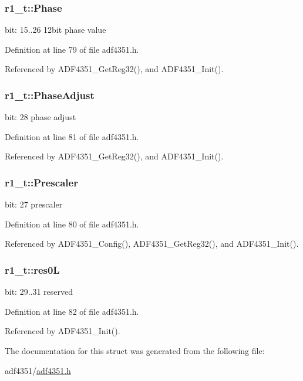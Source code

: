 \subsubsection[{\texorpdfstring{Phase}{Phase}}]{ r1\+\_\+t\+::\+Phase}\hypertarget{structr1__t_a08f87626a225a1256a9c45bb0d42af8a}{}\label{structr1__t_a08f87626a225a1256a9c45bb0d42af8a}
bit\+: 15..26 12bit phase value 

Definition at line 79 of file adf4351.\+h.



Referenced by A\+D\+F4351\+\_\+\+Get\+Reg32(), and A\+D\+F4351\+\_\+\+Init().

\subsubsection[{\texorpdfstring{Phase\+Adjust}{PhaseAdjust}}]{ r1\+\_\+t\+::\+Phase\+Adjust}\hypertarget{structr1__t_a339b676bde09218794b49904eb456a38}{}\label{structr1__t_a339b676bde09218794b49904eb456a38}
bit\+: 28 phase adjust 

Definition at line 81 of file adf4351.\+h.



Referenced by A\+D\+F4351\+\_\+\+Get\+Reg32(), and A\+D\+F4351\+\_\+\+Init().

\subsubsection[{\texorpdfstring{Prescaler}{Prescaler}}]{ r1\+\_\+t\+::\+Prescaler}\hypertarget{structr1__t_a9ee672a7fdd3a2d60591d43557feb390}{}\label{structr1__t_a9ee672a7fdd3a2d60591d43557feb390}
bit\+: 27 prescaler 

Definition at line 80 of file adf4351.\+h.



Referenced by A\+D\+F4351\+\_\+\+Config(), A\+D\+F4351\+\_\+\+Get\+Reg32(), and A\+D\+F4351\+\_\+\+Init().

\subsubsection[{\texorpdfstring{res0L}{res0L}}]{ r1\+\_\+t\+::res0L}\hypertarget{structr1__t_a0ce8c11e3227892e5d9afcde148d9300}{}\label{structr1__t_a0ce8c11e3227892e5d9afcde148d9300}
bit\+: 29..31 reserved 

Definition at line 82 of file adf4351.\+h.



Referenced by A\+D\+F4351\+\_\+\+Init().



The documentation for this struct was generated from the following file\+:\begin{DoxyCompactItemize}
\item 
adf4351/\hyperlink{adf4351_8h}{adf4351.\+h}\end{DoxyCompactItemize}
